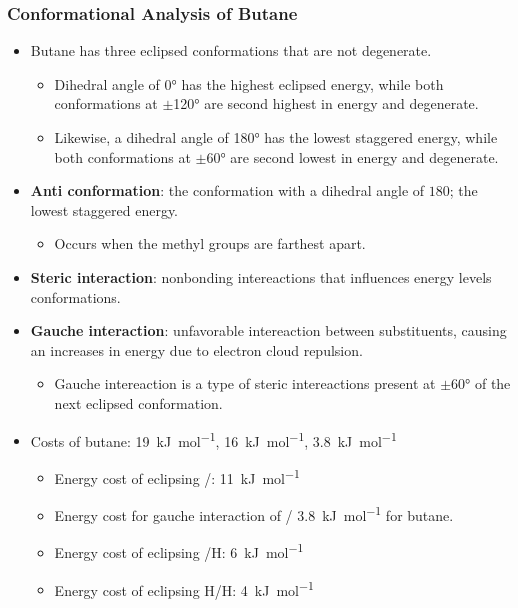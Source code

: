 \documentclass[12pt,a4paper]{article}
\begin{document}
\begin{itemize}
    \subsubsection{Conformational Analysis of Butane}
    \begin{itemize}
        \item Butane has three eclipsed conformations that are {\color{o-Sun}not degenerate}.
            \begin{itemize}
                \item Dihedral angle of \ang{0} has the highest eclipsed energy, while both conformations at \(\pm\)\ang{120} are second highest in energy and degenerate.
                \item Likewise, a dihedral angle of \ang{180} has the lowest staggered energy, while both conformations at \(\pm\)\ang{60} are second lowest in energy and degenerate.
            \end{itemize}
        \item \textbf{Anti conformation}: the conformation with a dihedral angle of \(180\); the lowest staggered energy.
            \begin{itemize}
                \item Occurs when the methyl groups are farthest apart.
            \end{itemize}
        \item \textbf{Steric interaction}: nonbonding intereactions that influences energy levels conformations.
        \item \textbf{Gauche interaction}: unfavorable intereaction between substituents, causing an increases in energy due to electron cloud repulsion.
            \begin{itemize}
                \item Gauche intereaction is a type of steric intereactions present at \(\pm\ang{60}\) of the next eclipsed conformation.
            \end{itemize}
        \item Costs of butane: \SI{19}{kJ\per\mole}, \SI{16}{kJ\per\mole}, \SI{3.8}{kJ\per\mole}
            \begin{itemize}
                \item Energy cost of eclipsing /: \SI{11}{kJ\per\mole}
                \item Energy cost for gauche interaction of / \SI{3.8}{kJ\per\mole} for butane.
                \item Energy cost of eclipsing /H: \SI{6}{kJ\per\mole} 
                \item Energy cost of eclipsing H/H: \SI{4}{kJ\per\mole} 
            \end{itemize}
    \end{itemize}
\end{itemize}
\end{document}
